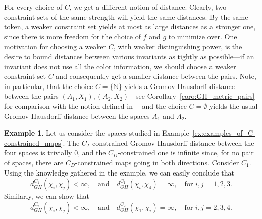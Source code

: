 \documentclass[8pt,a4paper,oneside,english,english]{article}
\theoremstyle{plain}
\theoremstyle
{plain}
\theoremstyle{definition}
\newtheorem{example}[theorem]{Example}%
\newcommand{\N}{\mathbb{N}}
\newcommand{\GH}{d_{GH}}
\begin{document}
For every choice of $C$, we get a different notion of distance. Clearly, two constraint sets of the same strength will yield the same distances. By the same token, a weaker constraint set yields at most as large distances as a stronger one, since there is more freedom for the choice of $f$ and $g$ to minimize over. One motivation for choosing a weaker $C$, with weaker distinguishing power, is the desire to bound distances between various invariants as tightly as possible---if an invariant does not use all the color information, we should choose a weaker constraint set $C$ and consequently get a smaller distance between the pairs.
Note, in particular, that the choice $C=\{\N\}$ yields a Gromov-Hausdorff distance between the pairs $(A_1, X_1), (A_2, X_2)$---see Corollary~\ref{coro:GH_metric_pairs} for comparison with the notion defined in \cite{GomChe}---and the choice $C=\emptyset$ yields the usual Gromov-Hausdorff distance between the spaces $A_1$ and $A_2$.

\begin{example}
    Let us consider the spaces studied in Example~\ref{ex:examples_of_C-constrained_maps}. The $C_T$-constrained Gromov-Hausdorff distance between the four spaces is trivially $0$, and the $C_D$-constrained one is infinite since, for no pair of spaces, there are $C_D$-constrained maps going in both directions. Consider $C_1$. Using the knowledge gathered in the example, we can easily conclude that
    \[
    \GH^{C_1}(\chi_i,\chi_j)<\infty,\quad \text{and}\quad \GH^{C_1}(\chi_i,\chi_4)=\infty,\quad\text{for $i,j=1,2,3$}.
    \]
    Similarly, we can show that
    \[
    \GH^{C_2}(\chi_i,\chi_j)<\infty,\quad \text{and}\quad \GH^{C_2}(\chi_1,\chi_i)=\infty,\quad\text{for $i,j=2,3,4$}.
    \]
\end{example}
\end{document}
